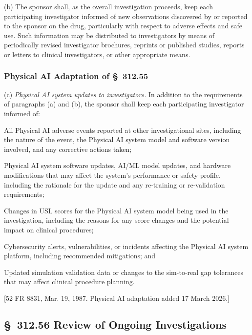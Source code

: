 \documentclass[11pt]{article}
\begin{document}
(b) The sponsor shall, as the overall investigation proceeds, keep each participating investigator informed of new observations discovered by or reported to the sponsor on the drug, particularly with respect to adverse effects and safe use. Such information may be distributed to investigators by means of periodically revised investigator brochures, reprints or published studies, reports or letters to clinical investigators, or other appropriate means.

\subsubsection{Physical AI Adaptation of \S~312.55}

(c) \textit{Physical AI system updates to investigators.} In addition to the requirements of paragraphs (a) and (b), the sponsor shall keep each participating investigator informed of:

\begin{description}[leftmargin=0.8cm,style=sameline]
\item[(i)] All Physical AI adverse events reported at other investigational sites, including the nature of the event, the Physical AI system model and software version involved, and any corrective actions taken;
\item[(ii)] Physical AI system software updates, AI/ML model updates, and hardware modifications that may affect the system's performance or safety profile, including the rationale for the update and any re-training or re-validation requirements;
\item[(iii)] Changes in USL scores for the Physical AI system model being used in the investigation, including the reasons for any score changes and the potential impact on clinical procedures;
\item[(iv)] Cybersecurity alerts, vulnerabilities, or incidents affecting the Physical AI system platform, including recommended mitigations; and
\item[(v)] Updated simulation validation data or changes to the sim-to-real gap tolerances that may affect clinical procedure planning.
\end{description}

[52 FR 8831, Mar. 19, 1987. Physical AI adaptation added 17 March 2026.]

\subsection{\S~312.56 Review of Ongoing Investigations}
\end{document}
